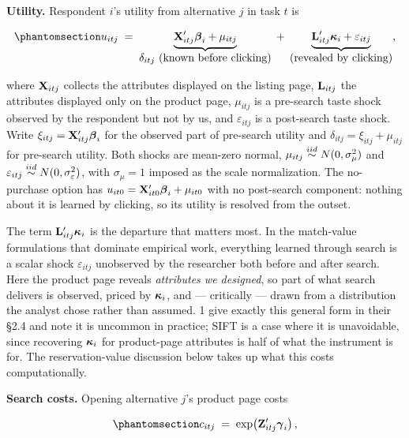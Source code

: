 \documentclass[
  letterpaper,
  DIV=11,
  numbers=noendperiod]{scrartcl}
\begin{document}
\textbf{Utility.} Respondent \(i\)'s utility from alternative \(j\) in
task \(t\) is

\begin{equation}\protect\phantomsection\label{eq-utility}{
u_{itj} \;=\; \underbrace{\bfX_{itj}'\bfbeta_i + \mu_{itj}}_{\displaystyle \delta_{itj}\ \text{(known before clicking)}} \;+\; \underbrace{\bfL_{itj}'\bfkappa_i + \varepsilon_{itj}}_{\displaystyle \text{(revealed by clicking)}} ,
}\end{equation}

where \(\mathbf{X}_{itj}\) collects the attributes displayed on the listing
page, \(\mathbf{L}_{itj}\) the attributes displayed only on the product page,
\(\mu_{itj}\) is a pre-search taste shock observed by the respondent but
not by us, and \(\varepsilon_{itj}\) is a post-search taste shock. Write
\(\xi_{itj} = \mathbf{X}_{itj}'\boldsymbol{\beta}_i\) for the observed part of pre-search
utility and \(\delta_{itj} = \xi_{itj} + \mu_{itj}\) for pre-search
utility. Both shocks are mean-zero normal,
\(\mu_{itj} \stackrel{iid}{\sim} N(0,\sigma_\mu^2)\) and
\(\varepsilon_{itj} \stackrel{iid}{\sim} N(0,\sigma_\varepsilon^2)\), with
\(\sigma_\mu = 1\) imposed as the scale normalization. The no-purchase
option has \(u_{it0} = \mathbf{X}_{it0}'\boldsymbol{\beta}_i + \mu_{it0}\) with no
post-search component: nothing about it is learned by clicking, so its
utility is resolved from the outset.

The term \(\mathbf{L}_{itj}'\boldsymbol{\kappa}_i\) is the departure that matters most.
In the match-value formulations that dominate empirical work, everything
learned through search is a scalar shock \(\varepsilon_{itj}\)
unobserved by the researcher both before and after search. Here the
product page reveals \emph{attributes we designed}, so part of what
search delivers is observed, priced by \(\boldsymbol{\kappa}_i\), and ---
critically --- drawn from a distribution the analyst chose rather than
assumed. 1 give exactly this general form in their §2.4 and note it is
uncommon in practice; SIFT is a case where it is unavoidable, since
recovering \(\boldsymbol{\kappa}_i\) for product-page attributes is half of what
the instrument is for. The reservation-value discussion below takes up
what this costs computationally.

\textbf{Search costs.} Opening alternative \(j\)'s product page costs

\begin{equation}\protect\phantomsection\label{eq-cost}{
\cost_{itj} \;=\; \exp\!\left(\bfZ_{itj}'\bfgamma_i\right),
}\end{equation}
\end{document}
